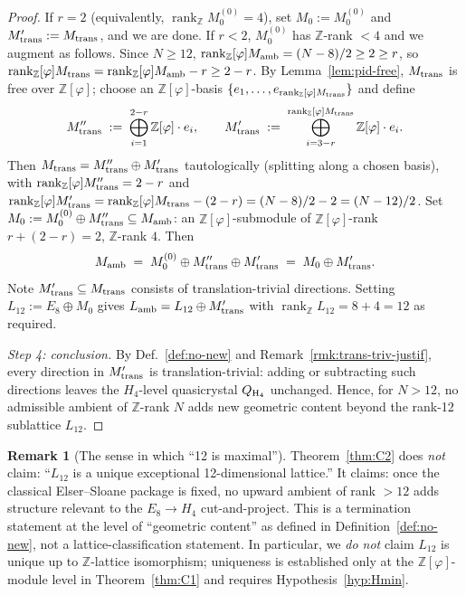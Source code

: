 \documentclass[11pt, a4paper]{amsart}
\theoremstyle{definition}
\newtheorem{remark}[theorem]{Remark}
\newcommand{\Z}{\mathbb{Z}}
\newcommand{\rk}{\operatorname{rank}}
\newcommand{\Ophi}{\mathbb{Z}[\varphi]}
\begin{document}
\begin{proof}
If $r = 2$ (equivalently, $\rk_\Z M_0^{(0)} = 4$), set $M_0 :=
M_0^{(0)}$ and $M_{\rm trans}' := M_{\rm trans}$, and we are
done. If $r < 2$, $M_0^{(0)}$ has $\Z$-rank $< 4$ and we
augment as follows. Since $N \geq 12$, $\rk_\Ophi M_{\rm amb}
= (N-8)/2 \geq 2 \geq r$, so $\rk_\Ophi M_{\rm trans} =
\rk_\Ophi M_{\rm amb} - r \geq 2 - r$. By
Lemma~\ref{lem:pid-free}, $M_{\rm trans}$ is free over $\Ophi$;
choose an $\Ophi$-basis $\{e_1, \ldots, e_{\rk_\Ophi M_{\rm
trans}}\}$ and define
\[
  M_{\rm trans}'' \;:=\; \bigoplus_{i=1}^{2-r} \Ophi \cdot e_i,
  \qquad
  M_{\rm trans}' \;:=\;
  \bigoplus_{i=3-r}^{\rk_\Ophi M_{\rm trans}} \Ophi \cdot e_i.
\]
Then $M_{\rm trans} = M_{\rm trans}'' \oplus M_{\rm trans}'$
tautologically (splitting along a chosen basis), with
$\rk_\Ophi M_{\rm trans}'' = 2 - r$ and $\rk_\Ophi M_{\rm
trans}' = \rk_\Ophi M_{\rm trans} - (2 - r) = (N-8)/2 - 2 =
(N-12)/2$. Set $M_0 := M_0^{(0)} \oplus M_{\rm trans}''
\subseteq M_{\rm amb}$: an $\Ophi$-submodule of $\Ophi$-rank
$r + (2-r) = 2$, $\Z$-rank $4$. Then
\[
  M_{\rm amb}
  \;=\; M_0^{(0)} \oplus M_{\rm trans}'' \oplus M_{\rm trans}'
  \;=\; M_0 \oplus M_{\rm trans}'.
\]
Note $M_{\rm trans}' \subseteq M_{\rm trans}$ consists of
translation-trivial directions. Setting $L_{12} := E_8 \oplus
M_0$ gives $L_{\rm amb} = L_{12} \oplus M_{\rm trans}'$ with
$\rk_\Z L_{12} = 8 + 4 = 12$ as required.

\emph{Step 4: conclusion.}
By Def.~\ref{def:no-new} and Remark~\ref{rmk:trans-triv-justif},
every direction in $M_{\rm trans}'$ is translation-trivial:
adding or subtracting such directions leaves the
$H_4$-level quasicrystal $Q_{\rm H_4}$ unchanged. Hence, for
$N > 12$, no admissible ambient of $\Z$-rank $N$ adds new
geometric content beyond the rank-12 sublattice $L_{12}$.
\end{proof}

\begin{remark}[The sense in which ``12 is maximal'']
\label{rmk:C2-sense}
Theorem~\ref{thm:C2} does \emph{not} claim: ``$L_{12}$ is a
unique exceptional 12-dimensional lattice.'' It claims: once
the classical Elser--Sloane package is fixed, no upward ambient
of rank $> 12$ adds structure relevant to the $E_8 \to H_4$
cut-and-project. This is a termination statement at the level of
``geometric content'' as defined in Definition~\ref{def:no-new},
not a lattice-classification statement. In particular, we
\emph{do not} claim $L_{12}$ is unique up to $\Z$-lattice
isomorphism; uniqueness is established only at the
$\Ophi$-module level in Theorem~\ref{thm:C1} and requires
Hypothesis~\ref{hyp:Hmin}.
\end{remark}
\end{document}
